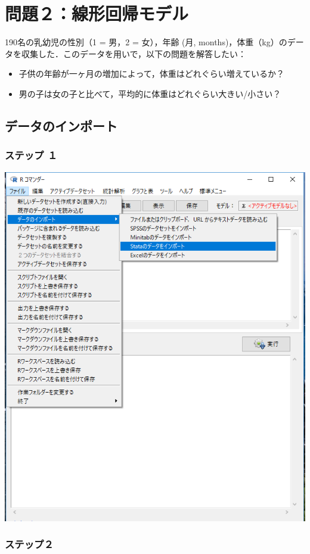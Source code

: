 \documentclass[11pt,]{problemset}
\begin{document}
\newpage
\vfill

\hypertarget{section-4}{%
\section{問題２：線形回帰モデル}\label{section-4}}

190名の乳幼児の性別（1 = 男，2 = 女），年齢 (月,
months)，体重（kg）のデータを収集した．このデータを用いで，以下の問題を解答したい：

\begin{itemize}
\item
  子供の年齢が一ヶ月の増加によって，体重はどれぐらい増えているか？
\item
  男の子は女の子と比べて，平均的に体重はどれぐらい大きい/小さい？
\end{itemize}

\hypertarget{section-5}{%
\subsection{データのインポート}\label{section-5}}

\hypertarget{section-6}{%
\subsubsection{ステップ １}\label{section-6}}

\begin{center}\includegraphics[width=0.5\linewidth]{pic/import00} \end{center}

\hypertarget{section-7}{%
\subsubsection{ステップ２}\label{section-7}}
\end{document}
